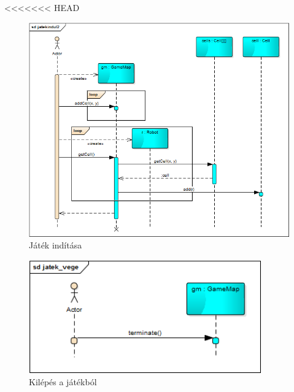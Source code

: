 <<<<<<< HEAD
\begin{figure}[!htbp]
	\begin{center}
		\includegraphics[width=14cm]{./chapters/chapter05/gamestart.png}
		\caption{Játék indítása}
	\end{center}
\end{figure}

\begin{figure}[!htbp]
	\begin{center}
		\includegraphics[width=10cm]{./chapters/chapter05/game_end.png}
		\caption{Kilépés a játékból}
	\end{center}
\end{figure}

\clearpage

